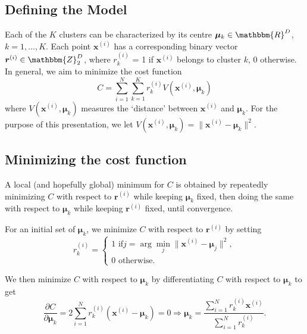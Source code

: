 \documentclass[final,3p,times]{elsarticle}
\begin{document}
\subsection*{Defining the Model}
\label{sect:Kmeans-def}

Each of the $K$ clusters can be characterized by its centre $\boldsymbol{\mu}_k \in \mathbbm{R}^D$, $k = 1, \dots , K$. Each point $\boldsymbol{x}^{(i)}$ has a corresponding binary vector $\boldsymbol{r}^{(i)} \in \mathbbm{Z}_2^D$, where $r_k^{(i)}$ = 1 if $\boldsymbol{x}^{(i)}$ belongs to cluster $k$, 0 otherwise. In general, we aim to minimize the cost function
\begin{equation}
C = \sum_{i = 1}^N \sum_{k = 1}^K r_k^{(i)} V(\boldsymbol{x}^{(i)}, \boldsymbol{\mu}_k)
\label{eqn:Kmeanscost}
\end{equation}
where $V(\boldsymbol{x}^{(i)}, \boldsymbol{\mu}_k)$ measures the `distance' between $\boldsymbol{x}^{(i)}$ and $\boldsymbol{\mu}_k$. For the purpose of this presentation, we let $V(\boldsymbol{x}^{(i)}, \boldsymbol{\mu}_k) = \| \boldsymbol{x}^{(i)} - \boldsymbol{\mu}_k \| ^2$.

\subsection*{Minimizing the cost function}
\label{sect:Kmeans-solve}

A local (and hopefully global) minimum for $C$ is obtained by repeatedly minimizing $C$ with respect to $\boldsymbol{r}^{(i)}$ while keeping $\boldsymbol{\mu}_k$ fixed, then doing the same with respect to $\boldsymbol{\mu}_k$ while keeping $\boldsymbol{r}^{(i)}$ fixed, until convergence.

For an initial set of $\boldsymbol{\mu}_k$, we minimize $C$ with respect to $\boldsymbol{r}^{(i)}$ by setting
\begin{equation}
r_k^{(i)} =
\begin{cases}
1 \text{ if} j = \arg \min_j \| \boldsymbol{x}^{(i)} - \boldsymbol{\mu}_j \| ^2, \\
 0 \text{ otherwise}.
\end{cases}
\label{eqn:Kmeansminr}
\end{equation}

We then minimize $C$ with respect to $\boldsymbol{\mu}_k$ by differentiating $C$ with respect to $\boldsymbol{\mu}_k$ to get
\begin{equation}
\frac{\partial C}{\partial \boldsymbol{\mu}_k} = 2 \sum_{i = 1}^N r_k^{(i)} (\boldsymbol{x}^{(i)} - \boldsymbol{\mu}_k) = 0
\Rightarrow \boldsymbol{\mu}_k = \frac{\sum_{i = 1}^N r_k^{(i)} \boldsymbol{x}^{(i)}}{\sum_{i = 1}^N r_k^{(i)}}.
\label{eqn:Kmeansminmu}
\end{equation}
\end{document}
